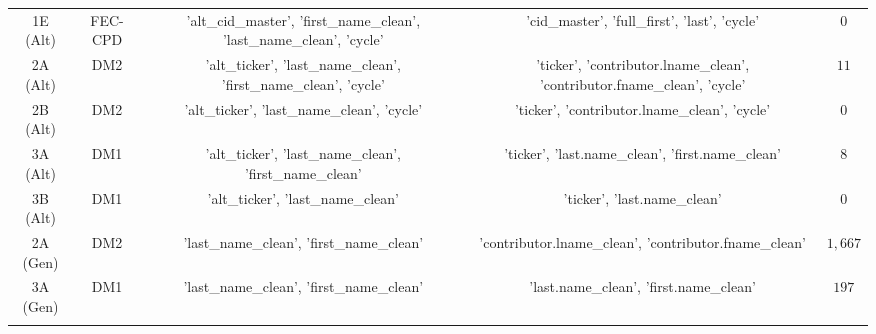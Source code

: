 \begin{table}[!htbp]
\begin{tabular}{@{\extracolsep{5pt}} ccccc}
1E (Alt) & FEC-CPD & 'alt\_cid\_master', 'first\_name\_clean', 'last\_name\_clean', 'cycle' & 'cid\_master', 'full\_first', 'last', 'cycle' & $0$ \\ 
2A (Alt) & DM2 & 'alt\_ticker', 'last\_name\_clean', 'first\_name\_clean', 'cycle' & 'ticker', 'contributor.lname\_clean', 'contributor.fname\_clean', 'cycle' & $11$ \\ 
2B (Alt) & DM2 & 'alt\_ticker', 'last\_name\_clean', 'cycle' & 'ticker', 'contributor.lname\_clean', 'cycle' & $0$ \\ 
3A (Alt) & DM1 & 'alt\_ticker', 'last\_name\_clean', 'first\_name\_clean' & 'ticker', 'last.name\_clean', 'first.name\_clean' & $8$ \\ 
3B (Alt) & DM1 & 'alt\_ticker', 'last\_name\_clean' & 'ticker', 'last.name\_clean' & $0$ \\ 
2A (Gen) & DM2 & 'last\_name\_clean', 'first\_name\_clean' & 'contributor.lname\_clean', 'contributor.fname\_clean' & $1,667$ \\ 
3A (Gen) & DM1 & 'last\_name\_clean', 'first\_name\_clean' & 'last.name\_clean', 'first.name\_clean' & $197$ \\ 
\hline \\[-1.8ex] 
\end{tabular} 
\end{table}  
